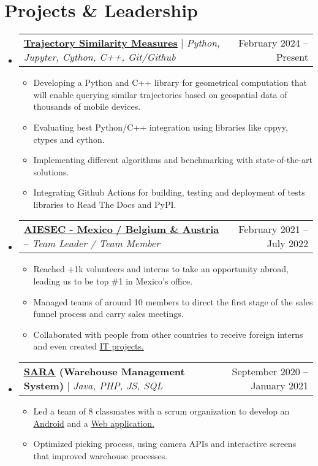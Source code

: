 \documentclass[letterpaper,11pt]{article}
\makeatletter
\newcommand{\resumeItem}[1]{
  \item\small{
    {#1 \vspace{-2pt}}
  }
}
\newcommand{\resumeProjectHeading}[2]{
    \item
    \begin{tabular*}{0.97\textwidth}{l@{\extracolsep{\fill}}r}
      \small#1 & #2 \\
    \end{tabular*}\vspace{-7pt}
}
\newcommand{\resumeSubHeadingListStart}{\begin{itemize}[leftmargin=0.15in, label={}]}
\newcommand{\resumeSubHeadingListEnd}{\end{itemize}}
\newcommand{\resumeItemListStart}{\begin{itemize}}
\newcommand{\resumeItemListEnd}{\end{itemize}\vspace{-5pt}}
\makeatother
\begin{document}
\section{Projects \& Leadership}
    \resumeSubHeadingListStart
      \resumeProjectHeading
          {\href{https://github.com/TT2024-B106/similarity-measures}
          {\textbf{\underline{Trajectory Similarity Measures}}} $|$
          \emph{Python, Jupyter, Cython, C++, Git/Github}}
          {February 2024 -- Present}
          \resumeItemListStart
            \resumeItem{Developing a Python and C++ library for geometrical computation that will enable querying
            similar trajectories based on geospatial data of thousands of mobile devices.}
            \resumeItem{Evaluating best Python/C++ integration using libraries like cppyy, ctypes and cython.}
            \resumeItem{Implementing different algorithms and benchmarking with state-of-the-art solutions.}
            \resumeItem{Integrating Github Actions for building, testing and deployment of tests libraries to Read The
            Docs and PyPI.}
          \resumeItemListEnd
      \resumeProjectHeading
          {\href{https://drive.google.com/file/d/1EMWTYJzj80dJdlMeuz7X3F-bEpyTPFCr/view}
          {\textbf{\underline{AIESEC - Mexico}}
          \textbf{/ Belgium \& Austria}} --
          \emph{Team Leader / Team Member}}{February 2021 -- July 2022}
          \resumeItemListStart
            \resumeItem{Reached +1k volunteers and interns to take an opportunity abroad, leading us to be top \#1 in
            Mexico’s office.}
            \resumeItem{Managed teams of around 10 members to direct the first stage of the sales funnel process and
            carry sales meetings.}
            \resumeItem{Collaborated with people from other countries to receive foreign interns and even created
            \href{https://github.com/edoomm/time-tracker}{\underline{IT projects}.}}
          \resumeItemListEnd
      \resumeProjectHeading
          {\textbf{\href{https://drive.google.com/file/d/1b1CNu-eeZlTg1rc_nXvGEXps3hik2itj/view}
          {\underline{SARA}}
          (Warehouse Management System)} $|$
          \emph{Java, PHP, JS, SQL}}
          {September 2020 -- January 2021}
          \resumeItemListStart
            \resumeItem{Led a team of 8 classmates with a scrum organization to develop an
            \href{https://github.com/edoomm/sistema-picking-app}{\underline{Android}} and a 
            \href{https://github.com/edoomm/sistema-picking-web}{\underline{Web application}.}}
            \resumeItem{Optimized picking process, using camera APIs and interactive screens that improved warehouse
            processes.}
          \resumeItemListEnd
    \resumeSubHeadingListEnd
\end{document}
